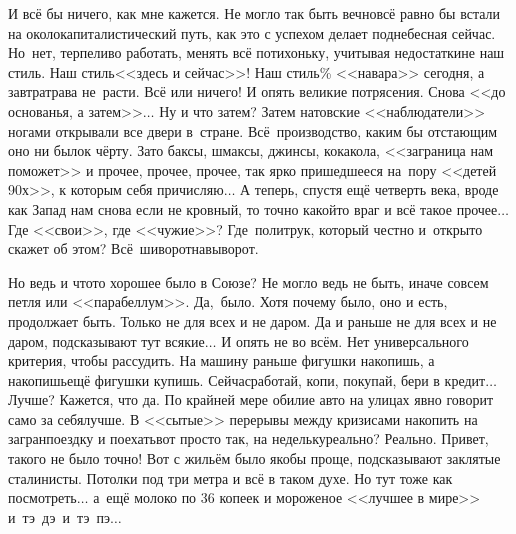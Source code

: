 И всё бы ничего, как мне кажется. Не могло так быть вечно\mdash всё равно бы встали на околокапиталистический путь, как это с успехом делает поднебесная сейчас. Но~нет, терпеливо работать, менять всё потихоньку, учитывая недостатки\mdash не наш стиль. Наш стиль\mdash <<здесь и сейчас>>! Наш стиль\% <<навара>> сегодня, а завтра\mdash трава не~расти. Всё или ничего! И опять великие потрясения. Снова <<до основанья, а затем>>$\ldots$ Ну и что затем? Затем натовские <<наблюдатели>> ногами открывали все двери в~стране. Всё~производство, каким бы отстающим оно ни было\mdash к чёрту. Зато баксы, шмаксы, джинсы, кока\sdash кола, <<заграница нам поможет>> и прочее, прочее, прочее, так ярко пришедшееся на~пору <<детей 90\sdash х>>, к которым себя причисляю$\ldots$ А теперь, спустя ещё четверть века, вроде как Запад нам снова если не кровный, то точно какой\sdash то враг и всё такое прочее$\ldots$ Где <<свои>>, где <<чужие>>? Где~политрук, который честно и~открыто скажет об этом? Всё~шиворот\sdash навыворот.

Но ведь и что\sdash то хорошее было в Союзе? Не могло ведь не быть, иначе совсем петля или <<парабеллум>>. Да,~было. Хотя почему было, оно и есть, продолжает быть. Только не для всех и не даром. Да и раньше не для всех и не даром, подсказывают тут всякие$\ldots$
И опять не во всём. Нет универсального критерия, чтобы рассудить. На машину раньше фигушки накопишь, а накопишь\mdash ещё фигушки купишь. Сейчас\mdash работай, копи, покупай, бери в кредит$\ldots$ Лучше? Кажется, что да. По крайней мере обилие авто на улицах явно говорит само за себя\mdash лучше. В <<сытые>> перерывы между кризисами накопить на загранпоездку и поехать\mdash вот просто так, на недельку\mdash реально? Реально. Привет, такого не было точно! 
Вот с жильём было якобы проще, подсказывают заклятые сталинисты. Потолки под три метра и всё в таком духе. Но тут тоже как посмотреть$\ldots$ а~ещё молоко по 36 копеек и мороженое <<лучшее в мире>> и~тэ~дэ~и~тэ~пэ$\ldots$ 

